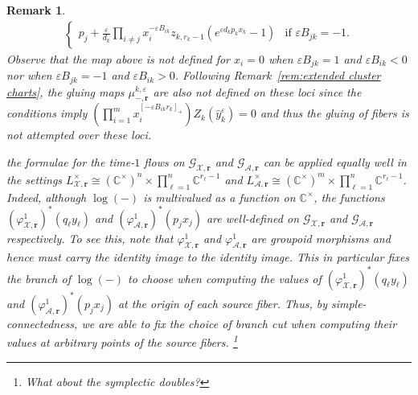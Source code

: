 \documentclass{amsart}
\newtheorem{remark}[theorem]{Remark}
\numberwithin{equation}{section}
\newcommand{\bfr}{{\boldsymbol{r}}}
\newcommand{\cA}{\mathcal{A}}
\newcommand{\cG}{\mathcal{G}}
\newcommand{\cX}{\mathcal{X}}
\newcommand{\CC}{\mathbb{C}}
\begin{document}
\begin{remark}
\begin{align*}
\begin{cases}
      p_j + \frac{\varepsilon}{d_k} \prod_{i\ne j} x_i^{-\varepsilon B_{ik}} z_{k,r_k-1} (e^{\varepsilon d_kp_kx_k} - 1) & \text{if $\varepsilon B_{jk} = -1$.}
    \end{cases}
  \end{align*}
  Observe that the map above is not defined for $x_i=0$ when $\varepsilon B_{jk}=1$ and $\varepsilon B_{ik} < 0$ nor when $\varepsilon B_{jk} = -1$ and $\varepsilon B_{ik} > 0$.
  Following Remark~\ref{rem:extended cluster charts}, the gluing maps $\mu_{-,\bfr}^{k,\varepsilon}$ are also not defined on these loci since the conditions imply $\left(\prod\limits_{i=1}^m x_i^{[-\varepsilon B_{ik}r_k]_+}\right)Z_k(\hat y_k^\varepsilon)=0$ and thus the gluing of fibers is not attempted over these loci. 
  
  
  the formulae for the time-$1$ flows on $\cG_{\cX,\bfr}$ and $\cG_{\cA,\bfr}$ can be applied equally well in the settings $L^\times_{\cX,\bfr}\cong(\CC^\times)^n\times\prod_{\ell=1}^n \CC^{r_\ell-1}$ and $L^\times_{\cA,\bfr}\cong(\CC^\times)^m\times\prod_{\ell=1}^n \CC^{r_\ell-1}$.
  Indeed, although $\log(-)$ is multivalued as a function on $\CC^\times$, the functions $(\varphi_{\cX,\bfr}^1)^*(q_\ell y_\ell)$ and $(\varphi_{\cA,\bfr}^1)^*(p_jx_j)$ are well-defined on $\cG_{\cX,\bfr}$ and $\cG_{\cA,\bfr}$ respectively.
  To see this, note that $\varphi_{\cX,\bfr}^1$ and $\varphi_{\cA,\bfr}^1$ are groupoid morphisms and hence must carry the identity image to the identity image.
  This in particular fixes the branch of $\log(-)$ to choose when computing the values of $(\varphi_{\cX,\bfr}^1)^*(q_\ell y_\ell)$ and $(\varphi_{\cA,\bfr}^1)^*(p_jx_j)$ at the origin of each source fiber.
  Thus, by simple-connectedness, we are able to fix the choice of branch cut when computing their values at arbitrary points of the source fibers. 
  \footnote{What about the symplectic doubles?}
\end{remark}
\end{document}
